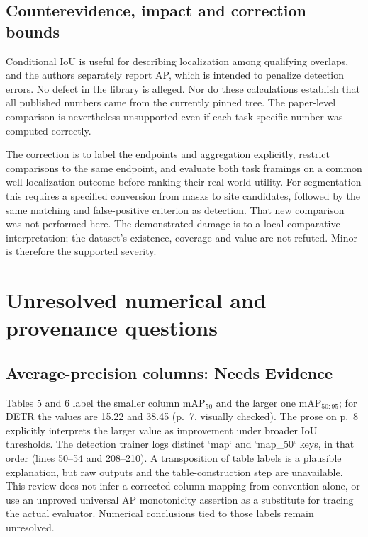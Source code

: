 \documentclass[10pt]{article}
\begin{document}
\subsection*{Counterevidence, impact and correction bounds}
Conditional IoU is useful for describing localization among qualifying overlaps, and the authors separately report AP, which is intended to penalize detection errors. No defect in the library is alleged. Nor do these calculations establish that all published numbers came from the currently pinned tree. The paper-level comparison is nevertheless unsupported even if each task-specific number was computed correctly.\par
The correction is to label the endpoints and aggregation explicitly, restrict comparisons to the same endpoint, and evaluate both task framings on a common well-localization outcome before ranking their real-world utility. For segmentation this requires a specified conversion from masks to site candidates, followed by the same matching and false-positive criterion as detection. That new comparison was not performed here. The demonstrated damage is to a local comparative interpretation; the dataset’s existence, coverage and value are not refuted. Minor is therefore the supported severity.\par
\section*{Unresolved numerical and provenance questions}
\subsection*{Average-precision columns: Needs Evidence}
Tables 5 and 6 label the smaller column \(\mathrm{mAP}_{50}\) and the larger one \(\mathrm{mAP}_{50:95}\); for DETR the values are 15.22 and 38.45 (p. 7, visually checked). The prose on p. 8 explicitly interprets the larger value as improvement under broader IoU thresholds. The detection trainer logs distinct `map` and `map\_50` keys, in that order (lines 50–54 and 208–210). A transposition of table labels is a plausible explanation, but raw outputs and the table-construction step are unavailable. This review does not infer a corrected column mapping from convention alone, or use an unproved universal AP monotonicity assertion as a substitute for tracing the actual evaluator. Numerical conclusions tied to those labels remain unresolved.\par
\end{document}
